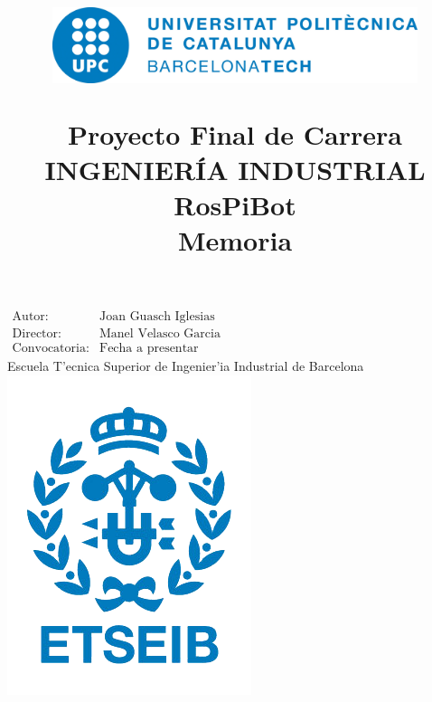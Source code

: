 \documentclass[twoside,12pt]{article}
\title{\begin{center} 
\includegraphics[width=0.8\textwidth]{images/upc-logo.png} 
\end{center} 
\vspace{0.5cm} 
Proyecto Final de Carrera\\
INGENIER\'IA INDUSTRIAL \\
\vspace{0.5cm} 
\Huge{
RosPiBot}
\vspace{0.5cm} \\
 Memoria}
\author{}
\date{} %
\begin{document}

\maketitle
\begin{center}
\large{$\begin{array}{ll}
\mbox{Autor:} & \mbox{Joan Guasch Iglesias} \\
\mbox{Director:} & \mbox{Manel Velasco Garcia} \\
\mbox{Convocatoria:} & \mbox{Fecha a presentar}
\end{array}$}\\ 
\vspace{2cm} 
\Large{Escuela T'ecnica Superior de Ingenier'ia Industrial de Barcelona}\\ 
\vspace{1cm}
\includegraphics[scale=1]{images/etseib-logo.png}
\end{center}
\thispagestyle{empty}
\newpage

\thispagestyle{empty}
\paragraph*{}
\newpage

\end{document}

